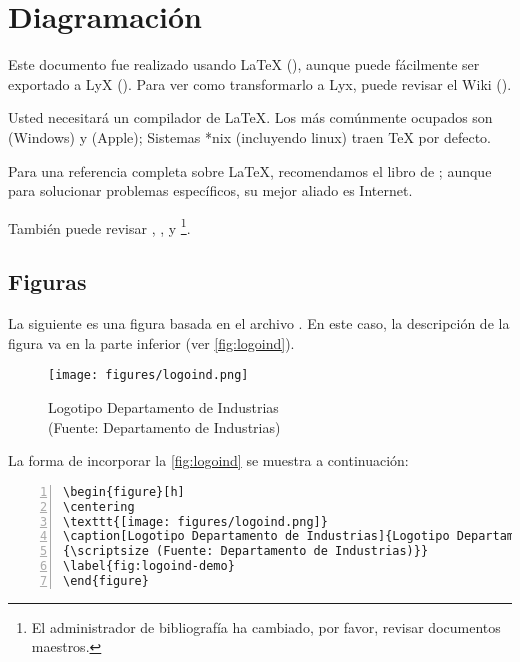 \section{Diagramación}
Este documento fue realizado usando \LaTeX{} (\citet{latex:whatis}), aunque puede fácilmente ser exportado a LyX (\citeauthor{lyx}). Para ver como transformarlo a Lyx, puede revisar el Wiki (\citeauthor{wikilyx}).

Usted necesitará un compilador de \LaTeX. Los más comúnmente ocupados son \citeauthor{miktex} (Windows) y \citeauthor{mactex} (Apple); Sistemas *nix (incluyendo linux) traen \TeX{} por defecto.

Para una referencia completa sobre \LaTeX{}, recomendamos el libro de \cite{Lamport94}; aunque para solucionar problemas específicos, su mejor aliado es Internet.

También puede revisar \citet{Roberts05}, \citet{Oetiker06}, y \citet{Mittelbach04}\footnote{El administrador de bibliografía ha cambiado, por favor, revisar documentos maestros.}.

\subsection{Figuras}
La siguiente es una figura basada en el archivo . En este caso, la descripción de la figura va en la parte inferior (ver \autoref{fig:logoind}).

\begin{figure}[ht!]
\centering
\texttt{[image: figures/logoind.png]}
\caption[Logotipo Departamento de Industrias]{Logotipo Departamento de Industrias\\
{\scriptsize (Fuente: Departamento de Industrias)}}
\label{fig:logoind}
\end{figure}

La forma de incorporar la \autoref{fig:logoind} se muestra a continuación:


\begin{Verbatim}[frame=lines, label=Incorporar \autoref{fig:logoind}
				, fontsize=\footnotesize, numbers=left
				, baselinestretch=1
				, formatcom=\color{gray}]
\begin{figure}[h]
\centering
\texttt{[image: figures/logoind.png]}
\caption[Logotipo Departamento de Industrias]{Logotipo Departamento de Industrias\\
{\scriptsize (Fuente: Departamento de Industrias)}}
\label{fig:logoind-demo}
\end{figure}
\end{Verbatim}

